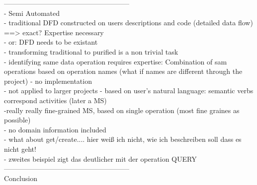 ------------------------------------------------------\\
- Semi Automated \\
- traditional DFD constructed on users descriptions and code (detailed data flow) ==> exact? Expertise necessary \\
- or: DFD needs to be existant \\
- transforming traditional to purified is a non trivial task \\
- identifying same data operation requires expertise: Combination of sam operations  based on operation names (what if names are different through the project)
- no implementation \\
- not applied to larger projects
- based on user's natural language: semantic verbs correspond activities (later a MS) \\
-really really fine-grained MS, based on single operation (most fine graines as possible) \\
- no domain information included\\
- what about get/create....   hier weiß ich nicht, wie ich beschreiben soll dass es nicht geht! \\
- zweites beispiel zigt das deutlicher mit der operation QUERY \\


------------------------------------------------------\\

Conclusion \\




